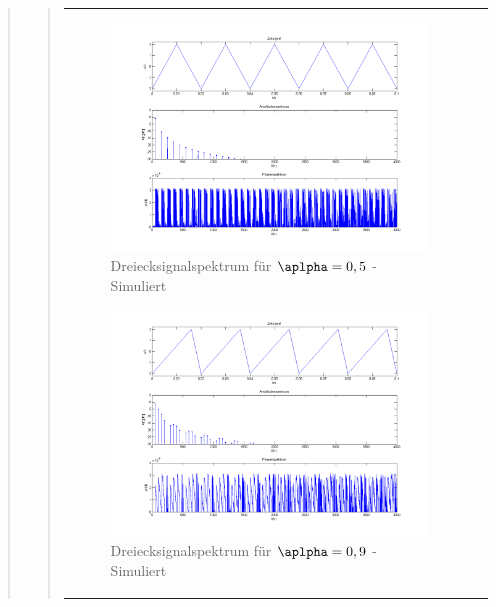 \begin{quote}
\begin{quote}
\begin{center}
\begin{tabular}{ll}
\begin{minipage}{0.6\textwidth}
                    \begin{figure}[H]
                        \label{fig:}            
                        \includegraphics[scale=0.25]{./Bilder/drei_alpha5.png} %
                        \caption{Dreiecksignalspektrum für $\aplpha = 0,5$ - Simuliert}
                    \end{figure}

                    \begin{figure}[H]
                        \label{fig:}            
                        \includegraphics[scale=0.25]{./Bilder/drei_alpha9.png} %
                        \caption{Dreiecksignalspektrum für $\aplpha = 0,9$ - Simuliert}
                    \end{figure}


\end{minipage}
\end{tabular}
\end{center}
\end{quote}
\end{quote}
